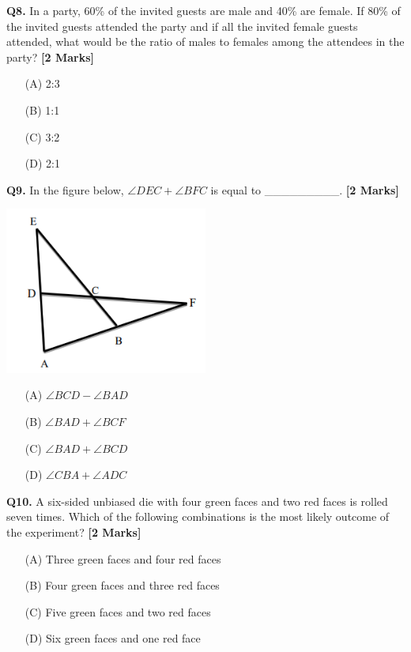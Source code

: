 \documentclass[11pt]{article}
\newcommand{\questionb}[2]{
    \noindent\textbf{Q#2.} #1 \hfill \textbf{[2 Marks]}
}
\begin{document}
\questionb{In a party, 60\% of the invited guests are male and 40\% are female. If 80\% of the invited guests attended the party and if all the invited female guests attended, what would be the ratio of males to females among the attendees in the party?}{8}
\begin{enumerate}
    \item[(A)] 2:3  
    \item[(B)] 1:1  
    \item[(C)] 3:2  
    \item[(D)] 2:1  
\end{enumerate}
\vspace{0.5cm}

\questionb{In the figure below, \(\angle DEC + \angle BFC\) is equal to \_\_\_\_\_\_\_\_\_.}{9}
\begin{center}
\includegraphics[width=0.5\textwidth]{figures/9.png}
\end{center}
\begin{enumerate}
    \item[(A)] \(\angle BCD - \angle BAD\)  
    \item[(B)] \(\angle BAD + \angle BCF\)  
    \item[(C)] \(\angle BAD + \angle BCD\)  
    \item[(D)] \(\angle CBA + \angle ADC\)  
\end{enumerate}
\vspace{0.5cm}

\questionb{A six-sided unbiased die with four green faces and two red faces is rolled seven times. Which of the following combinations is the most likely outcome of the experiment?}{10}
\begin{enumerate}
    \item[(A)] Three green faces and four red faces  
    \item[(B)] Four green faces and three red faces  
    \item[(C)] Five green faces and two red faces  
    \item[(D)] Six green faces and one red face  
\end{enumerate}
\vspace{0.5cm}
\end{document}
